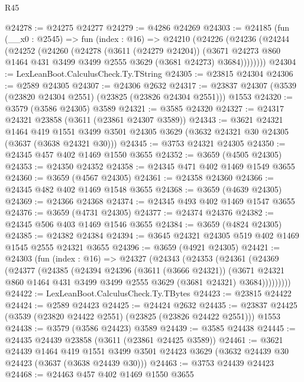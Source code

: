 \begin{lexlean}{R45}
\begin{coremodule}
@24278 := @24275 @24277
@24279 := @4286 @24269
@24303 := @24185
    (fun (__x0 : @2545) =>
    fun (index : @16) =>
    @24210
      (@24226
        (@24236
          (@24244
            (@24252
              (@24260
                (@24278
                  (@3611 (@24279 @24204))
                  (@3671 @24273 @860 @1464 @431 @3499 @3499 @2555 @3629 (@3681 @24273) @3684))))))))
@24304 := LexLeanBoot.CalculusCheck.Ty.TString
@24305 := @23815 @24304
@24306 := @2589 @24305
@24307 := @24306 @2632
@24317 := @23837 @24307 (@3539 (@23820 @24304 @2551) (@23825 (@23826 @24304 @2551))) @1553
@24320 := @3579 (@3586 @24305) @3589
@24321 := @3585 @24320
@24327 := @24317 @24321 @23858 (@3611 (@23861 @24307 @3589))
@24343 := @3621
    @24321
    @1464
    @419
    @1551
    @3499
    @3501
    @24305
    @3629
    (@3632 @24321 @30 @24305 (@3637 (@3638 @24321 @30)))
@24345 := @3753 @24321 @24305
@24350 := @24345 @457 @402 @1469 @1550 @3655
@24352 := @3659 (@4505 @24305)
@24353 := @24350 @24352
@24358 := @24345 @471 @402 @1469 @1549 @3655
@24360 := @3659 (@4567 @24305)
@24361 := @24358 @24360
@24366 := @24345 @482 @402 @1469 @1548 @3655
@24368 := @3659 (@4639 @24305)
@24369 := @24366 @24368
@24374 := @24345 @493 @402 @1469 @1547 @3655
@24376 := @3659 (@4731 @24305)
@24377 := @24374 @24376
@24382 := @24345 @506 @403 @1469 @1546 @3655
@24384 := @3659 (@4824 @24305)
@24385 := @24382 @24384
@24394 := @3645 @24321 @24305 @519 @402 @1469 @1545 @2555 @24321 @3655
@24396 := @3659 (@4921 @24305)
@24421 := @24303
    (fun (index : @16) =>
    @24327
      (@24343
        (@24353
          (@24361
            (@24369
              (@24377
                (@24385
                  (@24394
                    @24396
                    (@3611 (@3666 @24321))
                    (@3671
                      @24321
                      @860
                      @1464
                      @431
                      @3499
                      @3499
                      @2555
                      @3629
                      (@3681 @24321)
                      @3684)))))))))
@24422 := LexLeanBoot.CalculusCheck.Ty.TBytes
@24423 := @23815 @24422
@24424 := @2589 @24423
@24425 := @24424 @2632
@24435 := @23837 @24425 (@3539 (@23820 @24422 @2551) (@23825 (@23826 @24422 @2551))) @1553
@24438 := @3579 (@3586 @24423) @3589
@24439 := @3585 @24438
@24445 := @24435 @24439 @23858 (@3611 (@23861 @24425 @3589))
@24461 := @3621
    @24439
    @1464
    @419
    @1551
    @3499
    @3501
    @24423
    @3629
    (@3632 @24439 @30 @24423 (@3637 (@3638 @24439 @30)))
@24463 := @3753 @24439 @24423
@24468 := @24463 @457 @402 @1469 @1550 @3655

\end{coremodule}
\end{lexlean}
